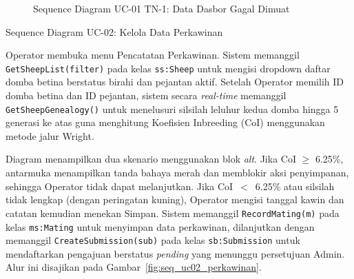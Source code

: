 \begin{figure}[htbp]
\centering
{}
\caption{Sequence Diagram UC-01 TN-1: Data Dasbor Gagal Dimuat}
\label{fig:seq_uc01_tn1_error}
\end{figure}

\newpage


\item{Sequence Diagram UC-02: Kelola Data Perkawinan}

Operator membuka menu Pencatatan Perkawinan. Sistem memanggil
\texttt{GetSheepList(filter)} pada kelas \texttt{ss:Sheep} untuk mengisi
dropdown daftar domba betina berstatus birahi dan pejantan aktif. Setelah
Operator memilih ID domba betina dan ID pejantan, sistem secara
\textit{real-time} memanggil \texttt{GetSheepGenealogy()} untuk menelusuri
silsilah leluhur kedua domba hingga 5 generasi ke atas guna menghitung
Koefisien Inbreeding (CoI) menggunakan metode jalur Wright.

Diagram menampilkan dua skenario menggunakan blok \textit{alt}. Jika CoI
$\ge$ 6.25\%, antarmuka menampilkan tanda bahaya merah dan memblokir aksi
penyimpanan, sehingga Operator tidak dapat melanjutkan. Jika CoI~$<$~6.25\%
atau silsilah tidak lengkap (dengan peringatan kuning), Operator mengisi
tanggal kawin dan catatan kemudian menekan Simpan. Sistem memanggil
\texttt{RecordMating(m)} pada kelas \texttt{ms:Mating} untuk menyimpan
data perkawinan, dilanjutkan dengan memanggil \texttt{CreateSubmission(sub)}
pada kelas \texttt{sb:Submission} untuk mendaftarkan pengajuan berstatus
\textit{pending} yang menunggu persetujuan Admin. Alur ini disajikan pada
Gambar~\ref{fig:seq_uc02_perkawinan}.

